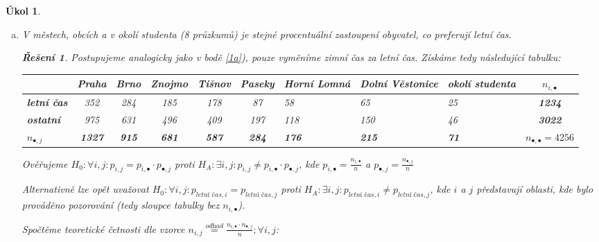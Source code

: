 \documentclass[11pt, a4paper]{article}
\theoremstyle{result}
\newtheorem*{result}{Řešení}
\newtheorem{task}{Úkol}
\begin{document}
\begin{task}
\begin{enumerate}[a)]
        \item V městech, obcích a v okolí studenta (8 průzkumů) je stejné procentuální zastoupení obyvatel, co preferují letní čas.

        \begin{result}
            Postupujeme analogicky jako v bodě \ref{1a}), pouze vyměníme \textit{zimní čas} za \textit{letní čas}. Získáme tedy následující tabulku:

            \begin{center}
                \begin{tabular}{ |l|c|c|c|c|c|M{1.5cm}|M{1.9cm}|M{1.8cm}|c| }
                    \hline
                    & \textbf{Praha} & \textbf{Brno} & \textbf{Znojmo} & \textbf{Tišnov} & \textbf{Paseky} & \textbf{Horní Lomná} & \textbf{Dolní Věstonice} & \textbf{okolí studenta} & \boldmath$n_{i, \bullet}$ \\
                    \hline
                    \textbf{letní čas} & 352 & 284 & 185 & 178 & 87 & 58 & 65 & 25 & \textbf{1234} \\
                    \hline
                    \textbf{ostatní} & 975 & 631 & 496 & 409 & 197 & 118 & 150 & 46 & \textbf{3022} \\
                    \hline
                    \boldmath$n_{\bullet, j}$ & \textbf{1327} & \textbf{915} & \textbf{681} & \textbf{587} & \textbf{284} & \textbf{176} & \textbf{215} & \textbf{71} & \boldmath$n_{\bullet, \bullet} = 4256$ \\
                    \hline
                \end{tabular}
            \end{center}

            Ověřujeme $H_0: \forall i, j: p_{i, j} = p_{i, \bullet} \cdot p_{\bullet, j}$ proti $H_A: \exists i, j: p_{i, j} \neq p_{i, \bullet} \cdot p_{\bullet, j}$, kde $p_{i, \bullet} = \frac{n_{i, \bullet}}{n}$ a $p_{\bullet, j} = \frac{n_{\bullet, j}}{n}$
    
            Alternativně lze opět uvažovat $H_0: \forall i, j: p_{\textit{letní čas}, i} = p_{\textit{letní čas}, j}$ proti $H_A: \exists i, j: p_{\textit{letní čas}, i} \neq p_{\textit{letní čas}, j}$, kde $i$ a $j$ představují oblasti, kde bylo prováděno pozorování (tedy sloupce tabulky bez $n_{i, \bullet}$).
    
            Spočtěme teoretické četnosti dle vzorce $n_{i, j} \overset{\textit{odhad}}= \frac{n_{i, \bullet} \cdot n_{\bullet, j}}{n}; \forall i,j$:
    

\end{result}
\end{enumerate}
\end{task}
\end{document}
